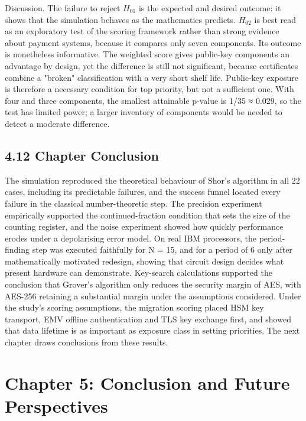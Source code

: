\documentclass[12pt,oneside]{report}
\begin{document}
Discussion. The failure to reject $H_{01}$ is the expected and desired outcome: it shows that the simulation behaves as the mathematics predicts. $H_{02}$ is best read as an exploratory test of the scoring framework rather than strong evidence about payment systems, because it compares only seven components. Its outcome is nonetheless informative. The weighted score gives public-key components an advantage by design, yet the difference is still not significant, because certificates combine a "broken" classification with a very short shelf life. Public-key exposure is therefore a necessary condition for top priority, but not a sufficient one. With four and three components, the smallest attainable p-value is 1/35 ≈ 0.029, so the test has limited power; a larger inventory of components would be needed to detect a moderate difference.
\par

\subsection*{4.12 Chapter Conclusion}

The simulation reproduced the theoretical behaviour of Shor's algorithm in all 22 cases, including its predictable failures, and the success funnel located every failure in the classical number-theoretic step. The precision experiment empirically supported the continued-fraction condition that sets the size of the counting register, and the noise experiment showed how quickly performance erodes under a depolarising error model. On real IBM processors, the period-finding step was executed faithfully for N = 15, and for a period of 6 only after mathematically motivated redesign, showing that circuit design decides what present hardware can demonstrate. Key-search calculations supported the conclusion that Grover's algorithm only reduces the security margin of AES, with AES-256 retaining a substantial margin under the assumptions considered. Under the study's scoring assumptions, the migration scoring placed HSM key transport, EMV offline authentication and TLS key exchange first, and showed that data lifetime is as important as exposure class in setting priorities. The next chapter draws conclusions from these results.
\par

\newpage
\section*{Chapter 5: Conclusion and Future Perspectives}
\end{document}
